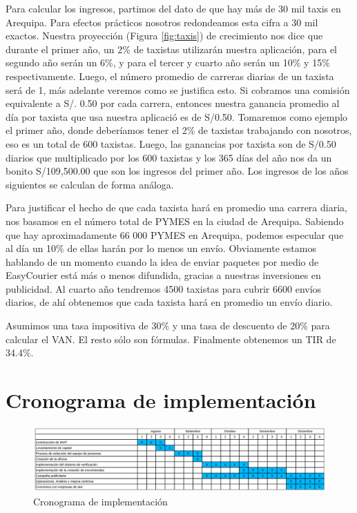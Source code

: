 Para calcular los ingresos, partimos del dato de que hay más de 30 mil taxis en Arequipa. Para efectos prácticos nosotros redondeamos esta cifra a 30 mil exactos. Nuestra proyección (Figura \ref{fig:taxis}) de crecimiento nos dice que durante el primer año, un 2\% de taxistas utilizarán nuestra aplicación, para el segundo año serán un 6\%, y para el tercer y cuarto año serán un 10\% y 15\% respectivamente. Luego, el número promedio de carreras diarias de un taxista será de 1, más adelante veremos como se justifica esto. Si cobramos una comisión equivalente a S/. 0.50 por cada carrera, entonces nuestra ganancia promedio al día por taxista que usa nuestra aplicació es de S/0.50. Tomaremos como ejemplo el primer año, donde deberíamos tener el 2\% de taxistas trabajando con nosotros, eso es un total de 600 taxistas. Luego, las ganancias por taxista son de S/0.50 diarios que multiplicado por los 600 taxistas y los 365 días del año nos da un bonito S/109,500.00 que son los ingresos del primer año. Los ingresos de los años siguientes se calculan de forma análoga.

Para justificar el hecho de que cada taxista hará en promedio una carrera diaria, nos basamos en el número total de PYMES en la ciudad de Arequipa. Sabiendo que hay aproximadamente 66 000 PYMES en Arequipa, podemos especular que al día un 10\% de ellas harán por lo menos un envío. Obviamente estamos hablando de un momento cuando la idea de enviar paquetes por medio de EasyCourier está más o menos difundida, gracias a nuestras inversiones en publicidad. Al cuarto año tendremos 4500 taxistas para cubrir 6600 envíos diarios, de ahí obtenemos que cada taxista hará en promedio un envío diario.

Asumimos una tasa impositiva de 30\% y una tasa de descuento de 20\% para calcular el VAN. El resto sólo son fórmulas. Finalmente obtenemos un TIR de 34.4\%.

\section{Cronograma de implementación}

\begin{figure}[htb]
\centering
\includegraphics[width=1\textwidth]{./img/cronograma}
\caption{Cronograma de implementación} \label{fig:cronograma}
\end{figure}

